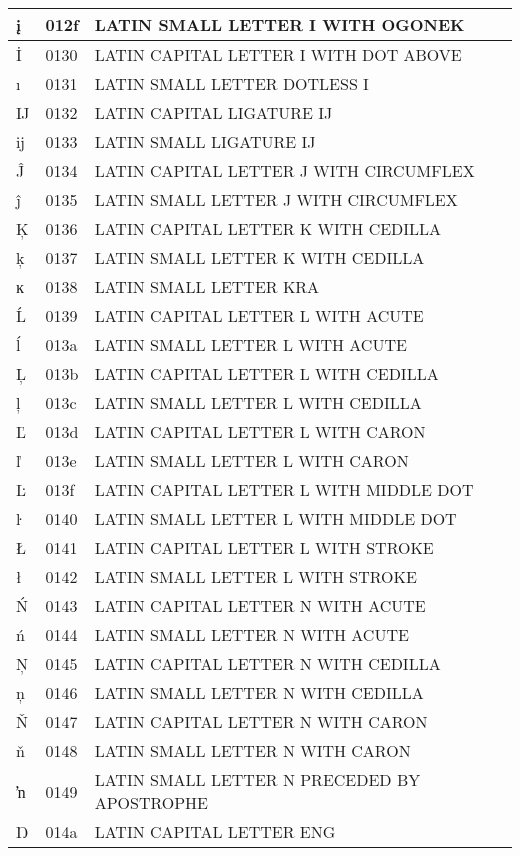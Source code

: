 \documentclass[12pt,letterpaper,openany]{book}
\begin{document}
\begin{center}
\begin{supertabular}{|m{0.25in}|m{0.5in}|m{4in}|}
			į & 012f & LATIN SMALL LETTER I WITH OGONEK\\\hline
			İ & 0130 & LATIN CAPITAL LETTER I WITH DOT ABOVE\\\hline
			ı & 0131 & LATIN SMALL LETTER DOTLESS I\\\hline
			Ĳ & 0132 & LATIN CAPITAL LIGATURE IJ\\\hline
			ĳ & 0133 & LATIN SMALL LIGATURE IJ\\\hline
			Ĵ & 0134 & LATIN CAPITAL LETTER J WITH CIRCUMFLEX\\\hline
			ĵ & 0135 & LATIN SMALL LETTER J WITH CIRCUMFLEX\\\hline
			Ķ & 0136 & LATIN CAPITAL LETTER K WITH CEDILLA\\\hline
			ķ & 0137 & LATIN SMALL LETTER K WITH CEDILLA\\\hline
			ĸ & 0138 & LATIN SMALL LETTER KRA\\\hline
			Ĺ & 0139 & LATIN CAPITAL LETTER L WITH ACUTE\\\hline
			ĺ & 013a & LATIN SMALL LETTER L WITH ACUTE\\\hline
			Ļ & 013b & LATIN CAPITAL LETTER L WITH CEDILLA\\\hline
			ļ & 013c & LATIN SMALL LETTER L WITH CEDILLA\\\hline
			Ľ & 013d & LATIN CAPITAL LETTER L WITH CARON\\\hline
			ľ & 013e & LATIN SMALL LETTER L WITH CARON\\\hline
			Ŀ & 013f & LATIN CAPITAL LETTER L WITH MIDDLE DOT\\\hline
			ŀ & 0140 & LATIN SMALL LETTER L WITH MIDDLE DOT\\\hline
			Ł & 0141 & LATIN CAPITAL LETTER L WITH STROKE\\\hline
			ł & 0142 & LATIN SMALL LETTER L WITH STROKE\\\hline
			Ń & 0143 & LATIN CAPITAL LETTER N WITH ACUTE\\\hline
			ń & 0144 & LATIN SMALL LETTER N WITH ACUTE\\\hline
			Ņ & 0145 & LATIN CAPITAL LETTER N WITH CEDILLA\\\hline
			ņ & 0146 & LATIN SMALL LETTER N WITH CEDILLA\\\hline
			Ň & 0147 & LATIN CAPITAL LETTER N WITH CARON\\\hline
			ň & 0148 & LATIN SMALL LETTER N WITH CARON\\\hline
			ŉ & 0149 & LATIN SMALL LETTER N PRECEDED BY APOSTROPHE\\\hline
			Ŋ & 014a & LATIN CAPITAL LETTER ENG\\\hline

\end{supertabular}
\end{center}
\end{document}
